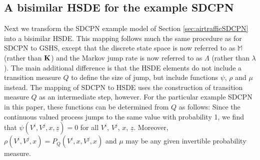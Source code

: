 \documentclass[copyright,creativecommons]{eptcs}
\begin{document}
\subsection{A bisimilar HSDE for the example SDCPN}\label{sec:sdcpnexample2}
Next we transform the SDCPN example model of Section \ref{sec:airtrafficSDCPN}
into a bisimilar HSDE. This mapping follows much the same procedure
as for SDCPN to GSHS,
except that the discrete state space is now referred to as $\mathbb{M}$
(rather than ${\bf K}$) and the Markov jump rate is now referred to as
$\Lambda$ (rather than $\lambda$). The main additional difference
is that the HSDE elements do not include a transition measure $Q$ to
define the size of jump, but include functions $\psi$, $\rho$ and
$\mu$ instead. The mapping of SDCPN to HSDE uses the construction of
transition measure $Q$ as an intermediate step, however.
For the particular example SDCPN in this paper, these
functions can be determined from $Q$ as follows:
Since the continuous valued process
jumps to the same value with probability 1, we find that
$\psi(V^i, V^j, x, \underline{z}) = 0$ for all $V^i$, $V^j$, $x$,
$\underline{z}$. Moreover, $\rho(V^i, V^j, x) = P_Q(V^i, x, V^j,
x)$ and $\mu$ may be any given invertible probability measure.
\end{document}
